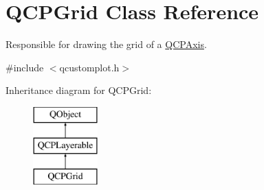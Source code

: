 \hypertarget{class_q_c_p_grid}{}\section{Q\+C\+P\+Grid Class Reference}
\label{class_q_c_p_grid}


Responsible for drawing the grid of a \hyperlink{class_q_c_p_axis}{Q\+C\+P\+Axis}.  




{\ttfamily \#include $<$qcustomplot.\+h$>$}

Inheritance diagram for Q\+C\+P\+Grid\+:\begin{figure}[H]
\begin{center}
\leavevmode
\includegraphics[height=3.000000cm]{class_q_c_p_grid}
\end{center}
\end{figure}

